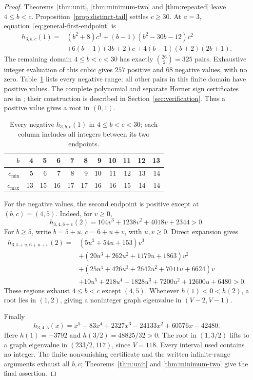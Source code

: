 \begin{proof}
Theorems~\ref{thm:unit}, \ref{thm:minimum-two} and \ref{thm:repeated}
leave $4\leq b<c$. Proposition~\ref{prop:distinct-tail} settles
$c\geq30$. At $a=3$, equation~\eqref{eq:general-first-endpoint} is
\begin{align*}
h_{3,b,c}(1)={}&(b^2+8)c^3+(b-1)(b^2-30b-12)c^2\\
&+6(b-1)(3b+2)c+4(b-1)(b+2)(2b+1).
\end{align*}
The remaining domain $4\leq b<c<30$ has exactly
$\binom{26}{2}=325$ pairs. Exhaustive integer evaluation of this
cubic gives $257$ positive and $68$ negative values, with no zero.
Table~\ref{tab:minimum-three-signs} lists every negative range;
all other pairs in this finite domain have positive values.
The complete polynomial and separate Horner sign certificates are in
; their construction is described in
Section~\ref{sec:verification}. Thus a positive value gives a root in $(0,1)$.

\begin{table}[ht]
\centering
\begin{tabular}{rrrrrrrrrrr}
\toprule
$b$&4&5&6&7&8&9&10&11&12&13\\
\midrule
$c_{\min}$&5&6&7&8&9&10&11&12&13&14\\
$c_{\max}$&13&15&16&17&17&16&16&15&14&14\\
\bottomrule
\end{tabular}
\caption{Every negative $h_{3,b,c}(1)$ in $4\leq b<c<30$;
each column includes all integers between its two endpoints.}
\label{tab:minimum-three-signs}
\end{table}

For the negative values, the second endpoint is positive except at
$(b,c)=(4,5)$. Indeed, for $v\geq0$,
\[
h_{3,4,6+v}(2)=104v^3+1238v^2+4018v+2344>0.
\]
For $b\geq5$, write $b=5+u$, $c=6+u+v$, with $u,v\geq0$.
Direct expansion gives
\begin{align*}
h_{3,5+u,6+u+v}(2)
={}&(5u^2+54u+153)v^3\\
&+(20u^3+262u^2+1179u+1863)v^2\\
&+(25u^4+426u^3+2642u^2+7011u+6624)v\\
&+10u^5+218u^4+1828u^3+7200u^2+12600u+6480>0.
\end{align*}
These regions exhaust $4\leq b<c$ except $(4,5)$. Whenever
$h(1)<0<h(2)$, a root lies in $(1,2)$, giving a noninteger graph
eigenvalue in $(V-2,V-1)$.

Finally
\[
h_{3,4,5}(x)=x^5-83x^4+2327x^3-24133x^2+60576x-42480.
\]
Here $h(1)=-3792$ and $h(3/2)=48825/32>0$. The root in
$(1,3/2)$ lifts to a graph eigenvalue in $(233/2,117)$, since $V=118$.
Every interval used contains no integer. The finite nonvanishing
certificate and the written infinite-range arguments exhaust all $b,c$;
Theorems~\ref{thm:unit} and \ref{thm:minimum-two} give the final assertion.
\end{proof}
